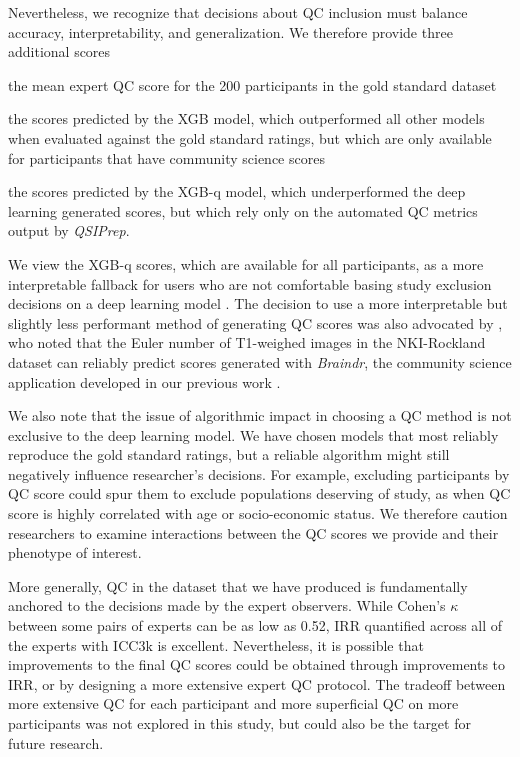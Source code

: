 \documentclass[9pt,lineno]{elife}
\begin{document}
Nevertheless, we recognize that decisions about QC inclusion must balance accuracy, interpretability, and generalization. We therefore provide three additional scores
\begin{enumerate*}[%
    label=(\roman*),%
    before=\unskip{: },%
    itemjoin={{, }},%
    itemjoin*={{, and }}]
    \item the mean expert QC score for the 200 participants in the gold standard
    dataset
    \item the scores predicted by the XGB model, which outperformed all other models
    when evaluated against the gold standard ratings, but which are only available
    for participants that have community science scores
    \item the scores predicted by the XGB-q model, which underperformed the deep
    learning generated scores, but which rely only on the automated QC metrics
    output by \emph{QSIPrep}.
\end{enumerate*}
We view the XGB-q scores, which are available for all participants, as a more interpretable fallback for users who are not
comfortable basing study exclusion decisions on a deep learning model
\citep{rudin2019stop}. 
The decision to use a more interpretable but slightly less
performant method of generating QC scores was also advocated by
\cite{tobe2021longitudinal}, who noted that the Euler number of T1-weighed
images in the NKI-Rockland dataset can reliably predict scores generated with
\emph{Braindr}, the community science application developed in our previous work
\citep{keshavan2019-er}.

We also note that the issue of algorithmic impact in choosing a QC method is not
exclusive to the deep learning model. We have chosen models that most reliably
reproduce the gold standard ratings, but a reliable algorithm might still
negatively influence researcher's decisions. For example, excluding participants
by QC score could spur them to exclude populations deserving of study, as when
QC score is highly correlated with age or socio-economic status. We therefore
caution researchers to examine interactions between the QC scores we provide and
their phenotype of interest.

More generally, QC in the dataset that we have produced is fundamentally
anchored to the decisions made by the expert observers. While Cohen's $\kappa$
between some pairs of experts can be as low as 0.52, IRR quantified across all
of the experts with ICC3k is excellent. Nevertheless, it is possible that
improvements to the final QC scores could be obtained through improvements to
IRR, or by designing a more extensive expert QC protocol. The tradeoff between
more extensive QC for each participant and more superficial QC on more participants was
not explored in this study, but could also be the target for future research.
\end{document}

